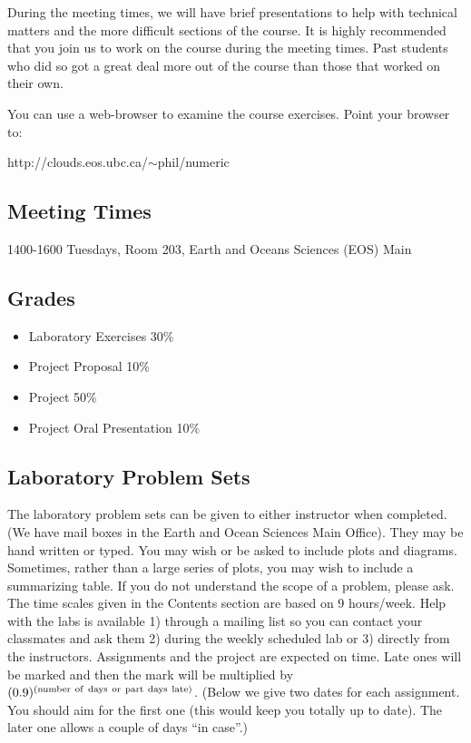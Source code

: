 \documentclass[10pt]{article}
\begin{document}
During the meeting times, we will have brief presentations to help with technical matters and the more difficult sections of the course.  It is highly recommended that you join us to work on the course during the meeting times.  Past students who did so got a great deal more out of the course than those that worked on their own.

You can use a web-browser to examine the
course exercises. Point your browser to: 

http://clouds.eos.ubc.ca/$\sim$phil/numeric

\subsection*{Meeting Times}

1400-1600 Tuesdays, Room 203, Earth and Oceans Sciences (EOS) Main

\subsection*{Grades}

\begin{itemize}
\item       Laboratory Exercises 30\%
\item       Project Proposal 10\% 
\item       Project 50\% 
\item	    Project Oral Presentation 10\%
\end{itemize}

\subsection*{Laboratory Problem Sets}

The laboratory problem sets can be given to either instructor when completed.
(We have mail boxes in the Earth and Ocean Sciences Main Office).
They may be hand written or typed.  You may wish or be asked to include
plots and diagrams.  Sometimes, rather than a large series of plots, you
may wish to include a summarizing table.  If you do not
understand the scope of a problem, please ask.  The time scales given
in the Contents section are based on 9 hours/week.  Help with the labs
is available 1) through a mailing list so you can contact your classmates
and ask them 2) during the weekly scheduled lab or 3) directly from the
instructors.  Assignments and the project are expected on
time.  Late ones will be marked and then the mark will be multiplied by
$(0.9)^{\rm (number\ of\ days\ or\ part\ days\ late)}$.
(Below we give two dates
for each assignment.  You should aim for the first one (this would keep you
totally up to date).  The later one allows a couple of days ``in case''.)
\end{document}

